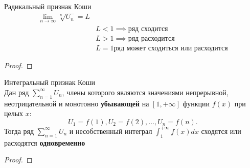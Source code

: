 \begin{priz}
    \label{priz:radcauchy} Радикальный признак Коши \\
    \begin{equation}
        \begin{align*}
            \lim_{n\to\infty}\sqrt[n]{U_{n}} = L \\
            &L < 1\implies \text{ряд сходится}\\
            &L > 1\implies \text{ряд расходится}\\
            &L = 1\text{ряд может сходиться или расходится}
        \end{align*}
    \end{equation}
    \begin{proof}
        
    \end{proof}
\end{priz}

\begin{priz}
    \label{priz:intcauchy} Интегральный признак Коши \\
    Дан ряд \(\sum_{n=1}^{\infty} U_{n}\), члены которого являются значениями 
    непрерывной, неотрицательной и монотонно \textbf{убывающей} 
    на \([1, +\infty]\) функции \(f(x)\) при целых \(x\):
    \begin{equation}
        U_{1} = f(1), U_{2} = f(2), \dots , U_{n} = f(n).
    \end{equation}
    Тогда ряд \(\sum_{n=1}^{\infty} U_{n}\) 
    и несобственный интеграл \(\int_{1}^{+\infty} f(x)dx \)
    сходятся или расходятся \textbf{одновременно}

    \begin{proof}
        
    \end{proof}
\end{priz}

